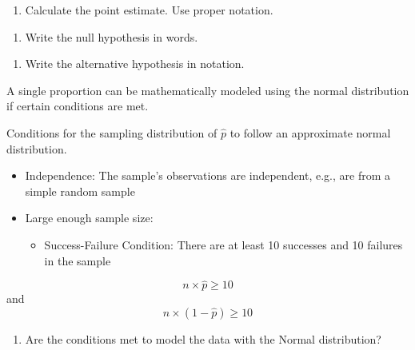 \documentclass[
]{report}
\providecommand{\tightlist}{%
  \setlength{\itemsep}{0pt}\setlength{\parskip}{0pt}}
\begin{document}
\vspace{0.6in}

\begin{enumerate}
\def\labelenumi{\arabic{enumi}.}
\setcounter{enumi}{1}
\tightlist
\item
  Calculate the point estimate. Use proper notation.
\end{enumerate}

\vspace{0.3in}

\begin{enumerate}
\def\labelenumi{\arabic{enumi}.}
\setcounter{enumi}{2}
\tightlist
\item
  Write the null hypothesis in words.
\end{enumerate}

\vspace{0.6in}

\begin{enumerate}
\def\labelenumi{\arabic{enumi}.}
\setcounter{enumi}{3}
\tightlist
\item
  Write the alternative hypothesis in notation.
\end{enumerate}

\vspace{0.2in}

A single proportion can be mathematically modeled using the normal distribution if certain conditions are met.

Conditions for the sampling distribution of \(\hat{p}\) to follow an approximate normal distribution.

\begin{itemize}
\item
  Independence: The sample's observations are independent, e.g., are from a simple random sample
\item
  Large enough sample size:

  \begin{itemize}
  \tightlist
  \item
    Success-Failure Condition: There are at least 10 successes and 10 failures in the sample
  \end{itemize}
\end{itemize}

\[n \times \hat{p} \ge 10\] and \[n \times (1-\hat{p}) \ge 10\]

\begin{enumerate}
\def\labelenumi{\arabic{enumi}.}
\setcounter{enumi}{4}
\tightlist
\item
  Are the conditions met to model the data with the Normal distribution?
\end{enumerate}
\end{document}
